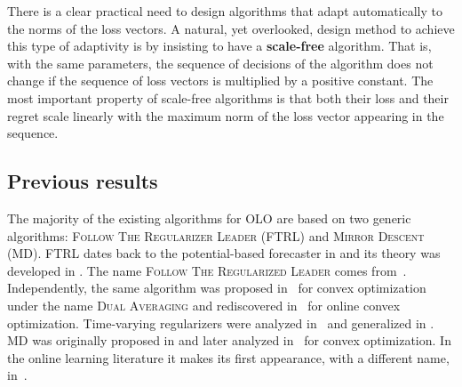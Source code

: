 \addtocounter{footnote}{-2}



There is a clear practical need to design algorithms that adapt automatically to
the norms of the loss vectors.  A natural, yet overlooked, design method to
achieve this type of adaptivity is by insisting to have a \textbf{scale-free}
algorithm.  That is, with the same parameters, the sequence of decisions of the
algorithm does not change if the sequence of loss vectors is multiplied by a
positive constant.  The most important property of scale-free algorithms is that
both their loss and their regret scale linearly with the maximum norm of the
loss vector appearing in the sequence.

\subsection{Previous results}

The majority of the existing algorithms for OLO are based on two generic
algorithms: \textsc{Follow The Regularizer Leader} (\textsc{FTRL}) and
\textsc{Mirror Descent} (\textsc{MD}). \textsc{FTRL} dates back to the
potential-based forecaster in \cite[Chapter~11]{Cesa-Bianchi-Lugosi-2006} and
its theory was developed in \cite{Shalev-Shwartz-2007}.  The name \textsc{Follow
The Regularized Leader} comes from~\cite{Abernethy-Hazan-Rakhlin-2008}.
Independently, the same algorithm was proposed in~\cite{Nestorov-2009} for
convex optimization under the name \textsc{Dual Averaging} and rediscovered
in~\cite{Xiao-2010} for online convex optimization. Time-varying regularizers
were analyzed in~\cite{Duchi-Hazan-Singer-2011} and generalized in
\cite{Orabona-Crammer-Cesa-Bianchi-2014}. \textsc{MD} was originally proposed in
\cite{Nemirovski-Yudin-1983} and later analyzed in~\cite{Beck-Teboulle-2003} for
convex optimization. In the online learning literature it makes its first
appearance, with a different name, in~\cite{Kivinen-Warmuth-1997}.

